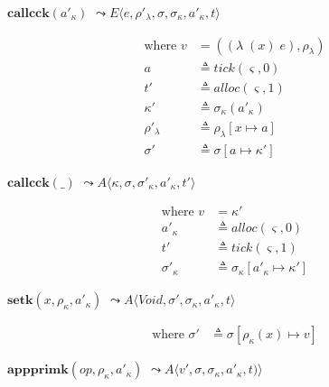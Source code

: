 \documentclass[12pt,draft]{article}
\newcommand{\singlelamsyn}[2]{(\lambda\;(#1)\;#2)}
\begin{document}
\begin{multicols*}{2}
\begin{center}
  $\textbf{callcck}(a'_\kappa)$
  $\leadsto E\langle e , \rho'_\lambda , \sigma , \sigma_\kappa , a'_\kappa , t \rangle$
\end{center}
\vspace{-7mm}
\begin{align*}
  \text{where } v &= (\singlelamsyn{x}{e} , \rho_{\lambda}) \\
  a &\triangleq tick(\varsigma, 0) \\
  t' &\triangleq alloc(\varsigma, 1) \\
  \kappa' &\triangleq \sigma_\kappa(a'_\kappa) \\
  \rho'_{\lambda} &\triangleq \rho_{\lambda}[x \mapsto a] \\
  \sigma' &\triangleq \sigma[a \mapsto \kappa']
\end{align*}
\begin{center}
  $\textbf{callcck}(\_)$
  $\leadsto A\langle \kappa , \sigma , \sigma'_\kappa , a'_\kappa  , t' \rangle$
\end{center}
\vspace{-7mm}
\begin{align*}
  \text{where }
  v &= \kappa' \\
  a'_\kappa &\triangleq alloc(\varsigma, 0) \\
  t' &\triangleq tick(\varsigma, 1) \\
  \sigma'_\kappa &\triangleq \sigma_\kappa[a'_\kappa \mapsto \kappa']
\end{align*}
\begin{center}
  $\textbf{setk}(x, \rho_\kappa, a'_\kappa)$
  $\leadsto A\langle \textit{Void} , \sigma' , \sigma_\kappa , a'_\kappa , t \rangle$
\end{center}
\vspace{-7mm}
\begin{align*}
\text{where } \sigma' &\triangleq \sigma[\rho_{\kappa}(x) \mapsto v]
\end{align*}
\begin{center}
  $\textbf{appprimk}(op, \rho_\kappa, a'_\kappa)$
  $\leadsto A\langle v' , \sigma , \sigma_\kappa , a'_\kappa ,t) \rangle$
\end{center}
\vspace{-7mm}

\end{multicols*}
\end{document}
